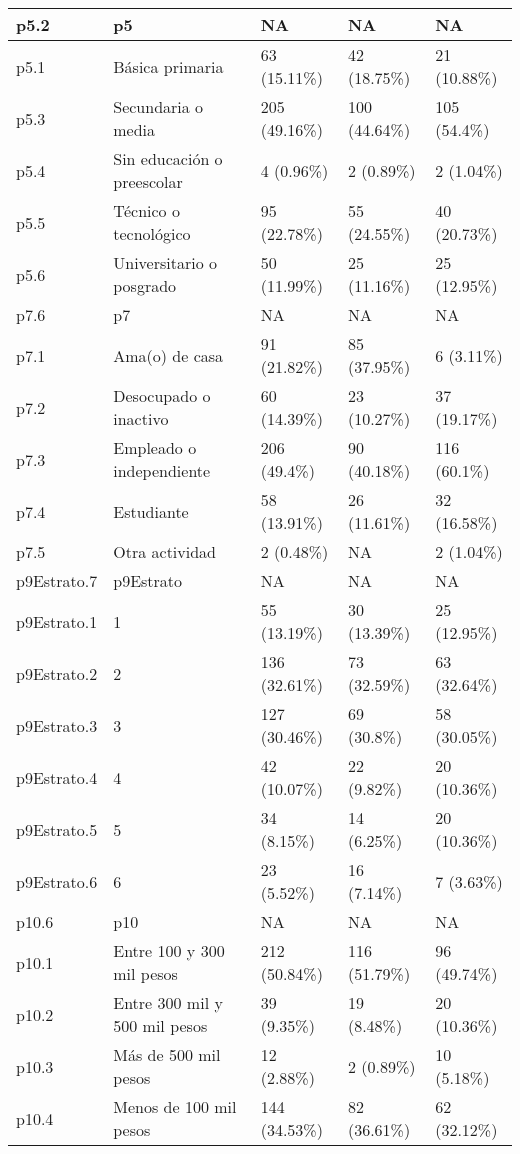 \begin{table}
{\begin{tabular}[t]{l|l|l|l|l}
\hline
p5.2 & p5 & NA & NA & NA\\
\hline
p5.1 & Básica primaria & 63 (15.11\%) & 42 (18.75\%) & 21 (10.88\%)\\
\hline
p5.3 & Secundaria o media & 205 (49.16\%) & 100 (44.64\%) & 105 (54.4\%)\\
\hline
p5.4 & Sin educación o preescolar & 4 (0.96\%) & 2 (0.89\%) & 2 (1.04\%)\\
\hline
p5.5 & Técnico o tecnológico & 95 (22.78\%) & 55 (24.55\%) & 40 (20.73\%)\\
\hline
p5.6 & Universitario o posgrado & 50 (11.99\%) & 25 (11.16\%) & 25 (12.95\%)\\
\hline
p7.6 & p7 & NA & NA & NA\\
\hline
p7.1 & Ama(o) de casa & 91 (21.82\%) & 85 (37.95\%) & 6 (3.11\%)\\
\hline
p7.2 & Desocupado o inactivo & 60 (14.39\%) & 23 (10.27\%) & 37 (19.17\%)\\
\hline
p7.3 & Empleado o independiente & 206 (49.4\%) & 90 (40.18\%) & 116 (60.1\%)\\
\hline
p7.4 & Estudiante & 58 (13.91\%) & 26 (11.61\%) & 32 (16.58\%)\\
\hline
p7.5 & Otra actividad & 2 (0.48\%) & NA & 2 (1.04\%)\\
\hline
p9Estrato.7 & p9Estrato & NA & NA & NA\\
\hline
p9Estrato.1 & 1 & 55 (13.19\%) & 30 (13.39\%) & 25 (12.95\%)\\
\hline
p9Estrato.2 & 2 & 136 (32.61\%) & 73 (32.59\%) & 63 (32.64\%)\\
\hline
p9Estrato.3 & 3 & 127 (30.46\%) & 69 (30.8\%) & 58 (30.05\%)\\
\hline
p9Estrato.4 & 4 & 42 (10.07\%) & 22 (9.82\%) & 20 (10.36\%)\\
\hline
p9Estrato.5 & 5 & 34 (8.15\%) & 14 (6.25\%) & 20 (10.36\%)\\
\hline
p9Estrato.6 & 6 & 23 (5.52\%) & 16 (7.14\%) & 7 (3.63\%)\\
\hline
p10.6 & p10 & NA & NA & NA\\
\hline
p10.1 & Entre 100 y 300 mil pesos & 212 (50.84\%) & 116 (51.79\%) & 96 (49.74\%)\\
\hline
p10.2 & Entre 300 mil y 500 mil pesos & 39 (9.35\%) & 19 (8.48\%) & 20 (10.36\%)\\
\hline
p10.3 & Más de 500 mil pesos & 12 (2.88\%) & 2 (0.89\%) & 10 (5.18\%)\\
\hline
p10.4 & Menos de 100 mil pesos & 144 (34.53\%) & 82 (36.61\%) & 62 (32.12\%)\\

\end{tabular}}
\end{table}
